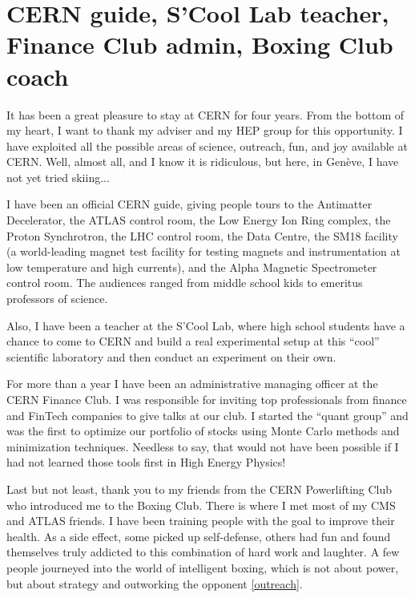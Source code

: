\section*{CERN guide, S'Cool Lab teacher, Finance Club admin, Boxing Club coach}

It has been a great pleasure to stay at CERN for four years. From the bottom of my heart, I want to thank my adviser and my HEP group for this opportunity. I have exploited all the possible areas of science, outreach, fun, and joy available at CERN. Well, almost all, and I know it is ridiculous, but here, in Gen\`eve, I have not yet tried skiing...

I have been an official CERN guide, giving people tours to the Antimatter Decelerator, the ATLAS control room, the Low Energy Ion Ring complex, the Proton Synchrotron, the LHC control room, the Data Centre, the SM18 facility (a world-leading magnet test facility for testing magnets and instrumentation at low temperature and high currents), and the Alpha Magnetic Spectrometer control room. The audiences ranged from middle school kids to emeritus professors of science. 

Also, I have been a teacher at the S'Cool Lab, where high school students have a chance to come to CERN and build a real experimental setup at this ``cool'' scientific laboratory and then conduct an experiment on their own. 

For more than a year I have been an administrative managing officer at the CERN Finance Club. I was responsible for inviting top professionals from finance and FinTech companies to give talks at our club. I started the ``quant group'' and was the first to optimize our portfolio of stocks using Monte Carlo methods and minimization techniques. Needless to say, that would not have been possible if I had not learned those tools first in High Energy Physics!

Last but not least, thank you to my friends from the CERN Powerlifting Club who introduced me to the Boxing Club. There is where I met most of my CMS and ATLAS friends. I have been training people with the goal to improve their health. As a side effect, some picked up self-defense, others had fun and found themselves truly addicted to this combination of hard work and laughter. A few people journeyed into the world of intelligent boxing, which is not about power, but about strategy and outworking the opponent \ref{outreach}. 



